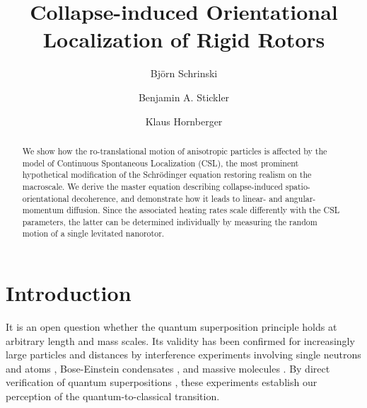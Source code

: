 \documentclass[%
 twocolumn,
 amsmath,amssymb,
 aps,
 pra,
]{revtex4-1}
\begin{document}
\title{Collapse-induced Orientational Localization of Rigid Rotors}

\author{Bj\"{o}rn Schrinski}
\author{Benjamin A. Stickler}
\author{Klaus Hornberger}

\begin{abstract}
We show how the ro-translational motion of anisotropic particles is affected by the model of Continuous Spontaneous Localization (CSL), the most prominent hypothetical modification of the Schr\"odinger equation restoring realism on the macroscale.
We derive the master equation describing collapse-induced spatio-orientational decoherence, and demonstrate how it leads to linear- and angular-momentum diffusion. Since the associated heating rates scale differently with the CSL parameters, the latter can be determined individually by measuring the random motion of a single levitated nanorotor.
\end{abstract}

\maketitle

\section{Introduction} 
It is an open question whether the quantum superposition principle holds at arbitrary length and mass scales. Its validity has been confirmed 
for increasingly large particles and distances by interference experiments involving single neutrons and atoms \cite{zawisky2002neutron,AtomInterfero1,AtomInterfero2,AtomInterfero3},  Bose-Einstein condensates \cite{Shin2004,Jo2007,Baumgaertner2010,Schmiedmayer2013,Schmiedmayer2014,Kasevich}, and massive molecules \cite{MolInterfero1,MolInterfero2,MolInterfero4}. By direct verification of quantum superpositions \cite{KlausMarkusNature}, these experiments establish our perception of the quantum-to-classical transition.
 
\end{document}
